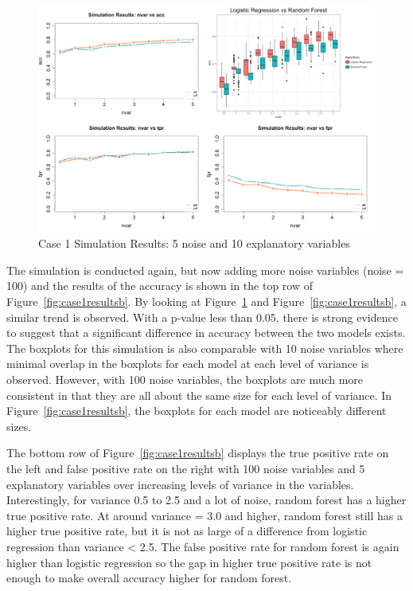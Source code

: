 \documentclass{llncs}
\begin{document}
\begin{figure}
\centering
\includegraphics[scale=0.55]{case1.png}
\caption{Case 1 Simulation Results: 5 noise and 10 explanatory variables}
\label{fig:case1results}
\end{figure}
\noindent 
The simulation is conducted again, but now adding more noise variables (noise = 100) and the results of the accuracy is shown in the top row of Figure~\ref{fig:case1resultsb}. By looking at Figure~\ref{fig:case1results} and Figure~\ref{fig:case1resultsb}, a similar trend is observed. With a p-value less than 0.05, there is strong evidence to suggest that a significant difference in accuracy between the two models exists. The boxplots for this simulation is also comparable with 10 noise variables where minimal overlap in the boxplots for each model at each level of variance is observed. However, with 100 noise variables, the boxplots are much more consistent in that they are all about the same size for each level of variance.  In Figure~\ref{fig:case1resultsb}, the boxplots for each model are noticeably different sizes.


\noindent 
The bottom row of Figure~\ref{fig:case1resultsb} displays the true positive rate on the left and false positive rate on the right with 100 noise variables and 5 explanatory variables over increasing levels of variance in the variables. Interestingly, for variance 0.5 to 2.5 and a lot of noise, random forest has a higher true positive rate.  At around variance = 3.0 and higher, random forest still has a higher true positive rate, but it is not as large of a difference from logistic regression than variance < 2.5. The false positive rate for random forest is again higher than logistic regression so the gap in higher true positive rate is not enough to make overall accuracy higher for random forest.
\end{document}
